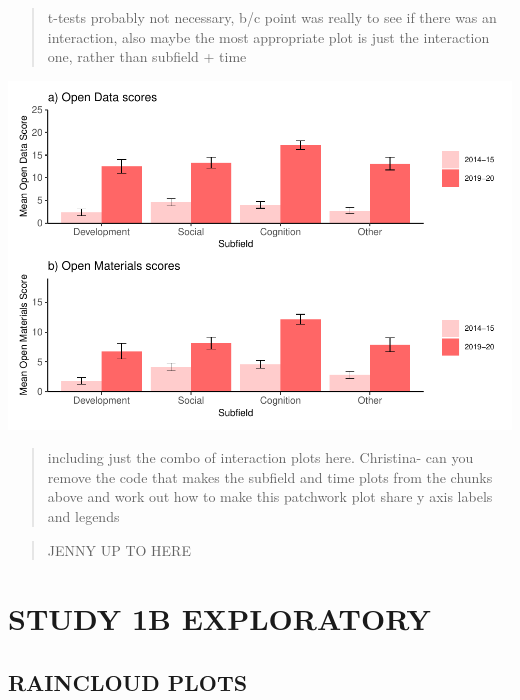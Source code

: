 \documentclass[
  english,
  man]{apa6}
\begin{document}
\begin{quote}
t-tests probably not necessary, b/c point was really to see if there was an interaction, also maybe the most appropriate plot is just the interaction one, rather than subfield + time
\end{quote}

\includegraphics{icd_special_issue_files/figure-latex/AB-m-plot-1.pdf}

\begin{quote}
including just the combo of interaction plots here. Christina- can you remove the code that makes the subfield and time plots from the chunks above and work out how to make this patchwork plot share y axis labels and legends
\end{quote}

\begin{quote}
JENNY UP TO HERE
\end{quote}

\hypertarget{study-1b-exploratory}{%
\section{STUDY 1B EXPLORATORY}\label{study-1b-exploratory}}

\hypertarget{raincloud-plots}{%
\subsection{RAINCLOUD PLOTS}\label{raincloud-plots}}
\end{document}
